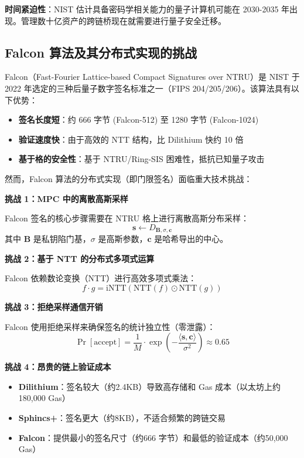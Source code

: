 \documentclass[12pt,a4paper]{article}
\begin{document}
\textbf{时间紧迫性}：NIST 估计具备密码学相关能力的量子计算机可能在 2030-2035 年出现。管理数十亿资产的跨链桥现在就需要进行量子安全迁移。

\subsection{Falcon 算法及其分布式实现的挑战}

Falcon（Fast-Fourier Lattice-based Compact Signatures over NTRU）是 NIST 于 2022 年选定的三种后量子数字签名标准之一（FIPS 204/205/206）。该算法具有以下优势：

\begin{itemize}
    \item \textbf{签名长度短}：约 666 字节 (Falcon-512) 至 1280 字节 (Falcon-1024)
    \item \textbf{验证速度快}：由于高效的 NTT 结构，比 Dilithium 快约 10 倍
    \item \textbf{基于格的安全性}：基于 NTRU/Ring-SIS 困难性，抵抗已知量子攻击
\end{itemize}

然而，Falcon 算法的分布式实现（即门限签名）面临重大技术挑战：

\textbf{挑战 1：MPC 中的离散高斯采样}

Falcon 签名的核心步骤需要在 NTRU 格上进行离散高斯分布采样：
$$\mathbf{s} \leftarrow D_{\mathbf{B}, \sigma, \mathbf{c}}$$
其中 $\mathbf{B}$ 是私钥陷门基，$\sigma$ 是高斯参数，$\mathbf{c}$ 是哈希导出的中心。

\textbf{挑战 2：基于 NTT 的分布式多项式运算}

Falcon 依赖数论变换（NTT）进行高效多项式乘法：
$$f \cdot g = \text{iNTT}(\text{NTT}(f) \odot \text{NTT}(g))$$

\textbf{挑战 3：拒绝采样通信开销}

Falcon 使用拒绝采样来确保签名的统计独立性（零泄露）：
$$\Pr[\text{accept}] = \frac{1}{M} \cdot \exp\left(-\frac{\langle \mathbf{s}, \mathbf{c} \rangle}{\sigma^2}\right) \approx 0.65$$

\textbf{挑战 4：昂贵的链上验证成本}

\begin{itemize}
    \item \textbf{Dilithium}：签名较大（约2.4KB）导致高存储和 Gas 成本（以太坊上约 180,000 Gas）
    \item \textbf{Sphincs+}：签名更大（约8KB），不适合频繁的跨链交易
    \item \textbf{Falcon}：提供最小的签名尺寸（约666 字节）和最低的验证成本（约50,000 Gas）
\end{itemize}
\end{document}
